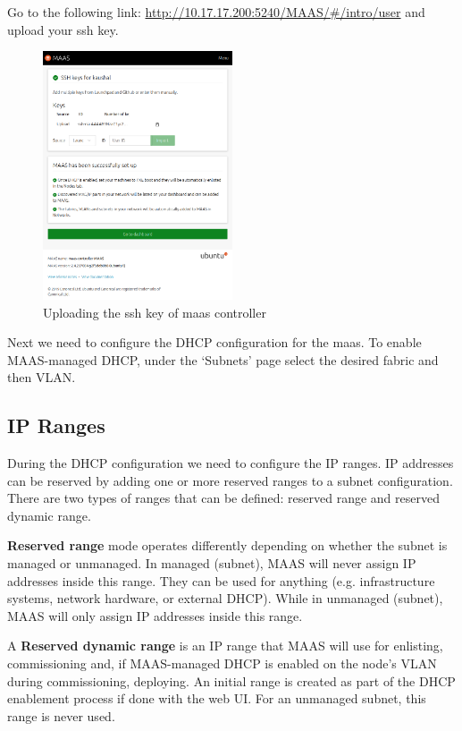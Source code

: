 Go to the following link: \url{http://10.17.17.200:5240/MAAS/#/intro/user} and upload your ssh key.

\begin{figure}[!ht]
    \centering
    \includegraphics[width=0.5\textwidth]{images/4-8.png}
    \caption{Uploading the ssh key of maas controller}
\end{figure}

Next we need to configure the DHCP configuration for the maas. To enable MAAS-managed DHCP, under the ‘Subnets’ page select the desired fabric and then VLAN.

\subsection{IP Ranges}

During the DHCP configuration we need to configure the IP ranges. IP addresses can be reserved by adding one or more reserved ranges to a subnet configuration. There are two types of ranges that can be defined: reserved range and reserved dynamic range.

\textbf{Reserved range} mode operates differently depending on whether the subnet is managed or unmanaged.
In managed (subnet), MAAS will never assign IP addresses inside this range. They can be used for anything (e.g. infrastructure systems, network hardware, or external DHCP). While in unmanaged (subnet), MAAS will only assign IP addresses inside this range.

A \textbf{Reserved dynamic range} is an IP range that MAAS will use for enlisting, commissioning and, if MAAS-managed DHCP is enabled on the node's VLAN during commissioning, deploying. An initial range is created as part of the DHCP enablement process if done with the web UI. For an unmanaged subnet, this range is never used.

